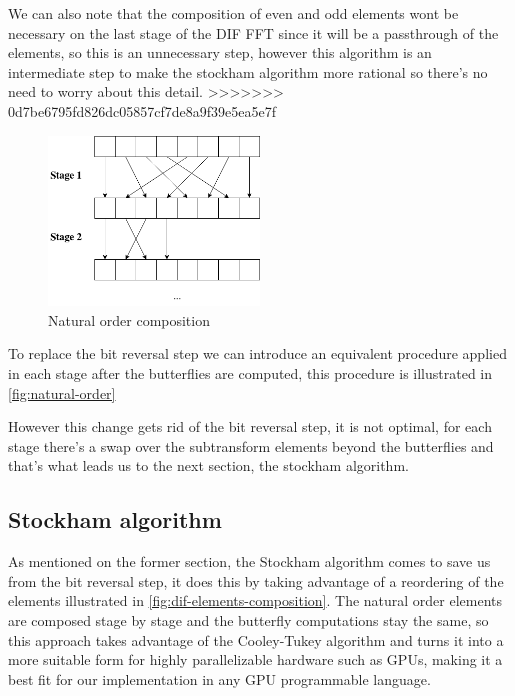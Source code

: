\documentclass[
  oneside,
  11pt, a4paper,
  footinclude=true,
  headinclude=true,
  cleardoublepage=empty
]{scrbook}
\begin{document}
We can also note that the composition of even and odd elements wont be necessary on the last stage of the DIF FFT since it will be a passthrough of the elements, so this is an unnecessary step, however this algorithm is an intermediate step to make the stockham algorithm more rational so there's no need to worry about this detail.
>>>>>>> 0d7be6795fd826dc05857cf7de8a9f39e5ea5e7f

\begin{figure}[h] 
    \centering
    \includegraphics[width=0.5\textwidth]{imgs/natural_order.png}
    \caption{Natural order composition}
    \label{fig:natural-order}
\end{figure}

To replace the bit reversal step we can introduce an equivalent procedure applied in each stage after the butterflies are computed,
this procedure is illustrated in \autoref{fig:natural-order}

However this change gets rid of the bit reversal step, it is not optimal, for each stage there's a swap over the subtransform elements beyond the butterflies and that's what leads us to the next section, the stockham algorithm.


\subsection{Stockham algorithm} \label{subsec:stockham-algorithm}

As mentioned on the former section, the Stockham algorithm comes to save us from the bit reversal step, it does this by taking advantage of a reordering of the elements \cite{govindaraju2008high} illustrated in \autoref{fig:dif-elements-composition}. The natural order elements are composed stage by stage and the butterfly computations stay the same, so this approach takes advantage of the Cooley-Tukey algorithm and turns it into a more suitable form for highly parallelizable hardware such as GPUs, making it a best fit for our implementation in any GPU programmable language. \newline
\end{document}
